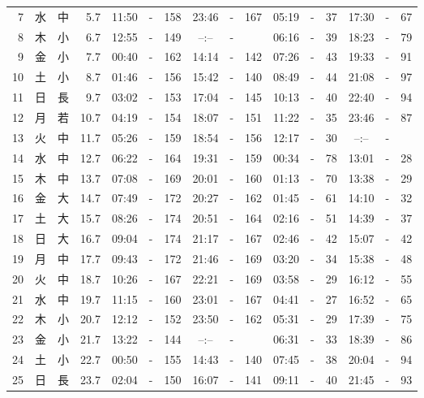 \documentclass[12pt.a4j]{jsarticle}
\begin{document}
\begin{center}
\begin{table}[ht]
\begin{tabular}{|rc|cr|ccrccr|ccrccr|}
 7 & 水 & 中 &  5.7 &  11:50 &-& 158  &  23:46 &-& 167  &   05:19 &-&  37  &   17:30 &-&  67  \\
 8 & 木 & 小 &  6.7 &  12:55 &-& 149  &  --:-- &-&     &   06:16 &-&  39  &   18:23 &-&  79  \\
 9 & 金 & 小 &  7.7 &  00:40 &-& 162  &  14:14 &-& 142  &   07:26 &-&  43  &   19:33 &-&  91  \\
10 & 土 & 小 &  8.7 &  01:46 &-& 156  &  15:42 &-& 140  &   08:49 &-&  44  &   21:08 &-&  97  \\
11 & 日 & 長 &  9.7 &  03:02 &-& 153  &  17:04 &-& 145  &   10:13 &-&  40  &   22:40 &-&  94  \\
12 & 月 & 若 & 10.7 &  04:19 &-& 154  &  18:07 &-& 151  &   11:22 &-&  35  &   23:46 &-&  87  \\
13 & 火 & 中 & 11.7 &  05:26 &-& 159  &  18:54 &-& 156  &   12:17 &-&  30  &   --:-- &-&     \\
14 & 水 & 中 & 12.7 &  06:22 &-& 164  &  19:31 &-& 159  &   00:34 &-&  78  &   13:01 &-&  28  \\
15 & 木 & 中 & 13.7 &  07:08 &-& 169  &  20:01 &-& 160  &   01:13 &-&  70  &   13:38 &-&  29  \\
16 & 金 & 大 & 14.7 &  07:49 &-& 172  &  20:27 &-& 162  &   01:45 &-&  61  &   14:10 &-&  32  \\
17 & 土 & 大 & 15.7 &  08:26 &-& 174  &  20:51 &-& 164  &   02:16 &-&  51  &   14:39 &-&  37  \\
18 & 日 & 大 & 16.7 &  09:04 &-& 174  &  21:17 &-& 167  &   02:46 &-&  42  &   15:07 &-&  42  \\
19 & 月 & 中 & 17.7 &  09:43 &-& 172  &  21:46 &-& 169  &   03:20 &-&  34  &   15:38 &-&  48  \\
20 & 火 & 中 & 18.7 &  10:26 &-& 167  &  22:21 &-& 169  &   03:58 &-&  29  &   16:12 &-&  55  \\
21 & 水 & 中 & 19.7 &  11:15 &-& 160  &  23:01 &-& 167  &   04:41 &-&  27  &   16:52 &-&  65  \\
22 & 木 & 小 & 20.7 &  12:12 &-& 152  &  23:50 &-& 162  &   05:31 &-&  29  &   17:39 &-&  75  \\
23 & 金 & 小 & 21.7 &  13:22 &-& 144  &  --:-- &-&     &   06:31 &-&  33  &   18:39 &-&  86  \\
24 & 土 & 小 & 22.7 &  00:50 &-& 155  &  14:43 &-& 140  &   07:45 &-&  38  &   20:04 &-&  94  \\
25 & 日 & 長 & 23.7 &  02:04 &-& 150  &  16:07 &-& 141  &   09:11 &-&  40  &   21:45 &-&  93  \\

\end{tabular}
\end{table}
\end{center}
\end{document}
